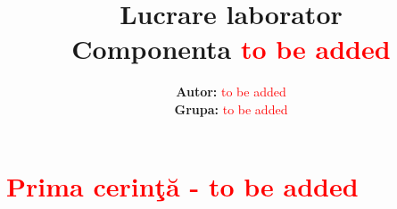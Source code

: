 \documentclass[a4paper, 11pt]{article}
\title{\textbf{Lucrare laborator} \\[1ex] \large \textbf{Componenta} \textcolor{red}{to be added}}
\author{\textbf{Autor:} \textcolor{red}{to be added}\\ \textbf{Grupa:} \textcolor{red}{to be added}}
\begin{document}
\maketitle

\section{\textcolor{red}{Prima cerin\c t\u a - to be added}}


\cite{2018_Tolstikhin}



\end{document}

